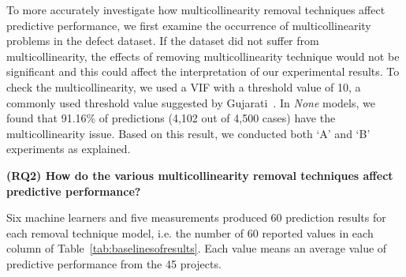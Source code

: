 To more accurately investigate how multicollinearity removal techniques affect predictive performance, we first examine the occurrence of multicollinearity problems in the defect dataset. If the dataset did not suffer from multicollinearity, the effects of removing multicollinearity technique would not be significant and this could affect the interpretation of our experimental results. To check the multicollinearity, we used a VIF with a threshold value of 10, a commonly used threshold value suggested by Gujarati~\cite{gujarati2009basic}. 
In \emph{None} models, we found that 91.16\%  of predictions (4,102 out of 4,500 cases) have the multicollinearity issue. Based on this result, we conducted both `A' and `B' experiments as explained.
\newline




\noindent \textbf{(RQ2) How do the various multicollinearity removal techniques affect predictive performance?}
\label{secRQ2}
\newline

Six machine learners and five measurements produced 60 prediction results for each removal technique model, i.e. the number of 60 reported values in each column of Table~\ref{tab:baselinesofresults}. Each value means an average value of predictive performance from the 45 projects. 

